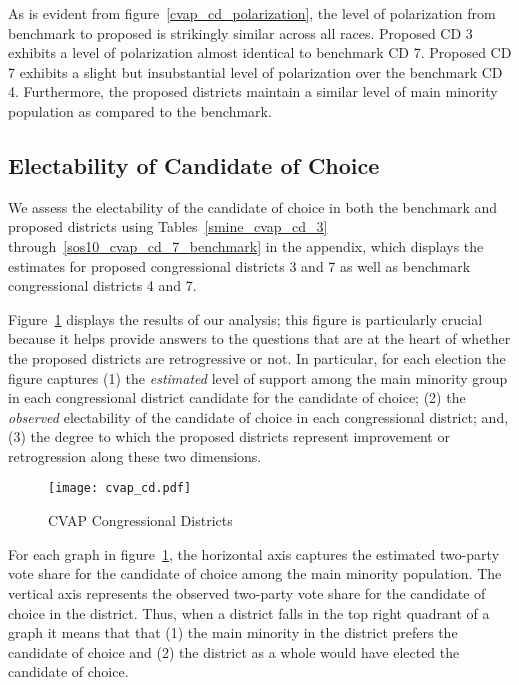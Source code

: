 \documentclass[12pt]{scrartcl}
\begin{document}
As is evident from figure~\ref{cvap_cd_polarization}, the level of polarization from benchmark to proposed is strikingly similar across all races. Proposed CD 3 exhibits a level of polarization almost identical to benchmark CD 7. Proposed CD 7 exhibits a slight but insubstantial level of polarization over the benchmark CD 4. Furthermore, the proposed districts maintain a similar level of main minority population as compared to the benchmark.

\subsection{Electability of Candidate of Choice}
We assess the electability of the candidate of choice in both the benchmark and proposed districts using Tables~\ref{smine_cvap_cd_3} through~\ref{sos10_cvap_cd_7_benchmark} in the appendix, which displays the estimates for proposed congressional districts 3 and 7 as well as benchmark congressional districts 4 and 7.

Figure~\ref{cvap_cd} displays the results of our analysis; this figure is particularly crucial because it helps provide answers to the questions that are at the heart of whether the proposed districts are retrogressive or not. In particular, for each election the figure captures (1) the {\it estimated} level of support  among the main minority group in each congressional district candidate for the candidate of choice; (2) the {\it observed} electability of the candidate of choice in each congressional district; and, (3) the degree to which the proposed districts represent improvement or retrogression along these two dimensions.

\begin{figure}[!h]
\begin{centering}
\texttt{[image: cvap\_cd.pdf]}
\caption{CVAP Congressional Districts}
\end{centering}
\label{cvap_cd}
\end{figure}

For each graph in figure~\ref{cvap_cd}, the horizontal axis captures the estimated two-party vote share for the candidate of choice among the main minority population. The vertical axis represents the observed two-party vote share for the candidate of choice in the district. Thus, when a district falls in the top right quadrant of a graph it means that that (1) the main minority in the district prefers the candidate of choice and (2) the district as a whole would have elected the candidate of choice. 
\end{document}
